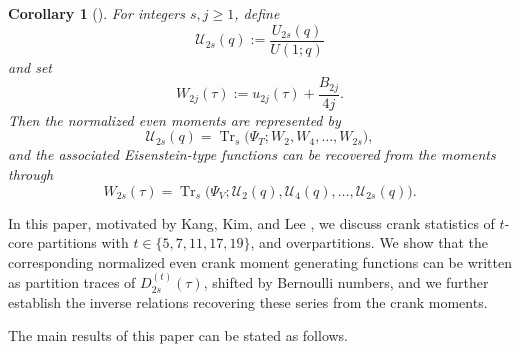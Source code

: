 \documentclass[12pt,oneside,reqno]{amsart}
\numberwithin{equation}{section}
\newtheorem{coro}[theorem]{{\bf Corollary}}
\begin{document}
\begin{coro}[{\cite[Corollary 4.4]{Kang2026}}]
	For integers $s,j\geq1$, define
	\[
	\mathcal{U}_{2s}(q)
	:=
	\frac{U_{2s}(q)}{U(1;q)}
	\]
	and set
	\[
	W_{2j}(\tau)
	:=
	u_{2j}(\tau)+\frac{B_{2j}}{4j}.
	\]
	Then the normalized even moments are represented by
	\begin{equation}\label{eq1.33}
		\mathcal{U}_{2s}(q)
		=
		\operatorname{Tr}_{s}
		\bigl(
		\Psi_T;
		W_2,W_4,\ldots,W_{2s}
		\bigr),
	\end{equation}
	and the associated Eisenstein-type functions can be recovered from
	the moments through
	\begin{equation}\label{eq1.34}
		W_{2s}(\tau)
		=
		\operatorname{Tr}_{s}
		\bigl(
		\Psi_V;
		\mathcal{U}_2(q),\mathcal{U}_4(q),\ldots,\mathcal{U}_{2s}(q)
		\bigr).
	\end{equation}
\end{coro}
In this paper, motivated by Kang, Kim, and Lee \cite{Kang2026}, we discuss crank statistics of $t$-core partitions with $t\in\{5,7,11,17,19\}$, and overpartitions. We show that the corresponding normalized even crank moment generating functions can be written as partition traces of $D^{(t)}_{2s}(\tau)$, shifted by Bernoulli numbers, and we further establish the inverse relations recovering these series from the crank moments.


The main results of this paper can be stated as follows.
\end{document}
